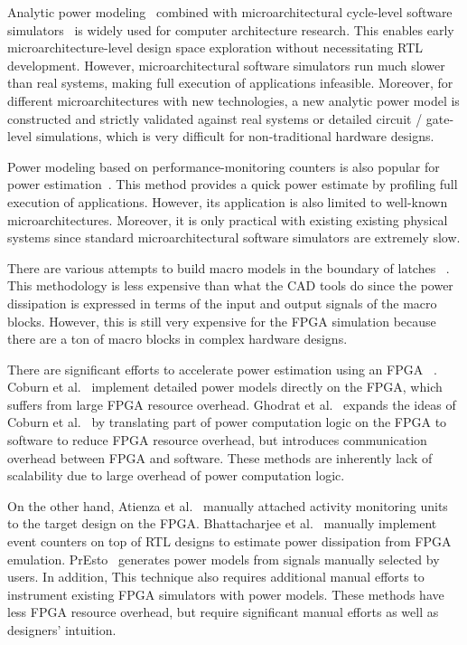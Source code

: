 Analytic power modeling~\cite{Brooks2000, Vijaykrishnan2000, Li2009, Leng2013, Shao2014}
combined with microarchitectural cycle-level software simulators~\cite{Binkert2011, Patel2011, Wenisch2006}
is widely used for computer architecture research. This enables early microarchitecture-level
design space exploration without necessitating RTL development. However, microarchitectural
software simulators run much slower than real systems, making full execution of applications infeasible.
Moreover, for different microarchitectures with new technologies, a new analytic power model
is constructed and strictly validated against real systems or detailed circuit / gate-level simulations,
which is very difficult for non-traditional hardware designs.

Power modeling based on performance-monitoring counters is also
popular for power estimation~\cite{Bellosa2000, Bircher2003, Isci2003,
  Bircher2005, Bircher2007, Bertran2013}.  This method provides a
quick power estimate by profiling full execution of applications.
However, its application is also limited to well-known microarchitectures.
Moreover, it is only practical with existing existing physical systems since
standard microarchitectural software simulators are extremely slow.

There are various attempts to build macro models in the boundary of latches
~\cite{Najm2000, Najm2000_2, Wu1998, Bogliolo2000}. This methodology is less
expensive than what the CAD tools do since the power dissipation is expressed
in terms of the input and output signals of the macro blocks. However,
this is still very expensive for the FPGA simulation because there are 
a ton of macro blocks in complex hardware designs.

There are significant efforts to accelerate power estimation using an FPGA
~\cite{Coburn2005, Ghodrat2007, Atienza2006, Bhattacharjee2008, Sunwoo2010, Yang2015, Kim2016}.
Coburn et al.~\cite{Coburn2005} implement detailed power models directly on the FPGA,
which suffers from large FPGA resource overhead. Ghodrat et al.~\cite{Ghodrat2007}
expands the ideas of Coburn et al.~\cite{Coburn2005} by translating part of 
power computation logic on the FPGA to software to reduce FPGA resource overhead,
but introduces communication overhead between FPGA and software. These methods
are inherently lack of scalability due to large overhead of power computation logic. 

On the other hand, Atienza et al.~\cite{Atienza2006} manually attached activity monitoring units
to the target design on the FPGA. Bhattacharjee et al.~\cite{Bhattacharjee2008} manually implement
event counters on top of RTL designs to estimate power dissipation from FPGA emulation.
PrEsto~\cite{Sunwoo2010} generates power models from signals manually selected by users.
In addition, This technique also requires additional manual efforts to instrument existing
FPGA simulators with power models. These methods have less FPGA resource overhead,
but require significant manual efforts as well as designers' intuition.

